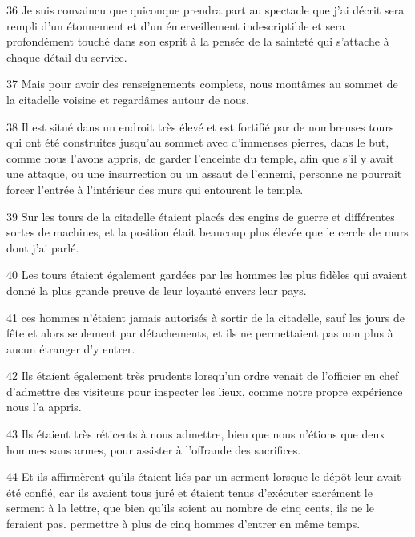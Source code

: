 \par 36 Je suis convaincu que quiconque prendra part au spectacle que j'ai décrit sera rempli d'un étonnement et d'un émerveillement indescriptible et sera profondément touché dans son esprit à la pensée de la sainteté qui s'attache à chaque détail du service.

\par 37 Mais pour avoir des renseignements complets, nous montâmes au sommet de la citadelle voisine et regardâmes autour de nous.

\par 38 Il est situé dans un endroit très élevé et est fortifié par de nombreuses tours qui ont été construites jusqu'au sommet avec d'immenses pierres, dans le but, comme nous l'avons appris, de garder l'enceinte du temple, afin que s'il y avait une attaque, ou une insurrection ou un assaut de l'ennemi, personne ne pourrait forcer l'entrée à l'intérieur des murs qui entourent le temple.

\par 39 Sur les tours de la citadelle étaient placés des engins de guerre et différentes sortes de machines, et la position était beaucoup plus élevée que le cercle de murs dont j'ai parlé.

\par 40 Les tours étaient également gardées par les hommes les plus fidèles qui avaient donné la plus grande preuve de leur loyauté envers leur pays.

\par 41 ces hommes n'étaient jamais autorisés à sortir de la citadelle, sauf les jours de fête et alors seulement par détachements, et ils ne permettaient pas non plus à aucun étranger d'y entrer.

\par 42 Ils étaient également très prudents lorsqu'un ordre venait de l'officier en chef d'admettre des visiteurs pour inspecter les lieux, comme notre propre expérience nous l'a appris.

\par 43 Ils étaient très réticents à nous admettre, bien que nous n'étions que deux hommes sans armes, pour assister à l'offrande des sacrifices.

\par 44 Et ils affirmèrent qu'ils étaient liés par un serment lorsque le dépôt leur avait été confié, car ils avaient tous juré et étaient tenus d'exécuter sacrément le serment à la lettre, que bien qu'ils soient au nombre de cinq cents, ils ne le feraient pas. permettre à plus de cinq hommes d’entrer en même temps.

